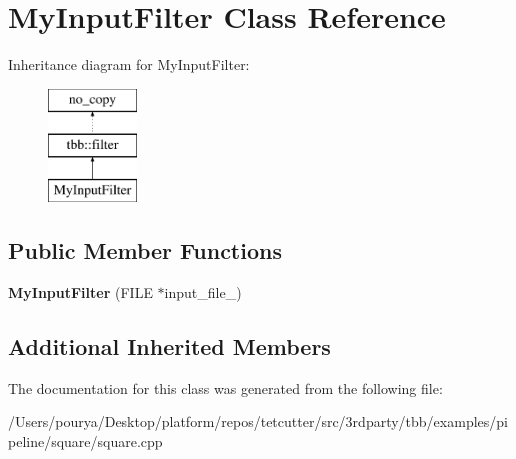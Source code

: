 \hypertarget{classMyInputFilter}{}\section{My\+Input\+Filter Class Reference}
\label{classMyInputFilter}
Inheritance diagram for My\+Input\+Filter\+:\begin{figure}[H]
\begin{center}
\leavevmode
\includegraphics[height=3.000000cm]{classMyInputFilter}
\end{center}
\end{figure}
\subsection*{Public Member Functions}
\begin{DoxyCompactItemize}
\item 
\hypertarget{classMyInputFilter_a560f38f543873e24bc239f93b39ecdf9}{}{\bfseries My\+Input\+Filter} (F\+I\+L\+E $\ast$input\+\_\+file\+\_\+)\label{classMyInputFilter_a560f38f543873e24bc239f93b39ecdf9}

\end{DoxyCompactItemize}
\subsection*{Additional Inherited Members}


The documentation for this class was generated from the following file\+:\begin{DoxyCompactItemize}
\item 
/\+Users/pourya/\+Desktop/platform/repos/tetcutter/src/3rdparty/tbb/examples/pipeline/square/square.\+cpp\end{DoxyCompactItemize}
